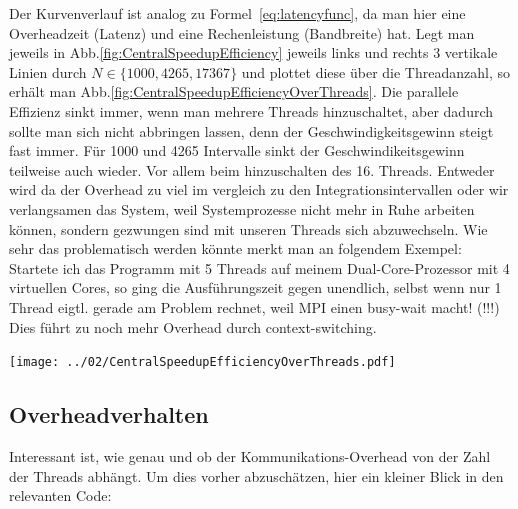 \documentclass[12pt,a4paper]{article}
\begin{document}
Der Kurvenverlauf ist analog zu Formel~\ref{eq:latencyfunc}, da man hier eine Overheadzeit (Latenz) und eine Rechenleistung (Bandbreite) hat. Legt man jeweils in Abb.\ref{fig:CentralSpeedupEfficiency} jeweils links und rechts 3 vertikale Linien durch $N\in\lbrace 1000,4265,17367\rbrace$ und plottet diese über die Threadanzahl, so erhält man Abb.\ref{fig:CentralSpeedupEfficiencyOverThreads}. Die parallele Effizienz sinkt immer, wenn man mehrere Threads hinzuschaltet, aber dadurch sollte man sich nicht abbringen lassen, denn der Geschwindigkeitsgewinn steigt fast immer. Für 1000 und 4265 Intervalle sinkt der Geschwindikeitsgewinn teilweise auch wieder. Vor allem beim hinzuschalten des 16. Threads. Entweder wird da der Overhead zu viel im vergleich zu den Integrationsintervallen oder wir verlangsamen das System, weil Systemprozesse nicht mehr in Ruhe arbeiten können, sondern gezwungen sind mit unseren Threads sich abzuwechseln. Wie sehr das problematisch werden könnte merkt man an folgendem Exempel: Startete ich das Programm mit 5 Threads auf meinem Dual-Core-Prozessor mit 4 virtuellen Cores, so ging die Ausführungszeit gegen unendlich, selbst wenn nur 1 Thread eigtl. gerade am Problem rechnet, weil MPI einen busy-wait macht! (!!!) Dies führt zu noch mehr Overhead durch context-switching.\\

\begin{center}
	\captionsetup{type=figure}
	\centering
	\begin{minipage}{\linewidth}
		\texttt{[image: ../02/CentralSpeedupEfficiencyOverThreads.pdf]}
	\end{minipage}
	\label{fig:CentralSpeedupEfficiency}
\end{center}


\subsection{Overheadverhalten}

Interessant ist, wie genau und ob der Kommunikations-Overhead von der Zahl der Threads abhängt. Um dies vorher abzuschätzen, hier ein kleiner Blick in den relevanten Code:
\end{document}
